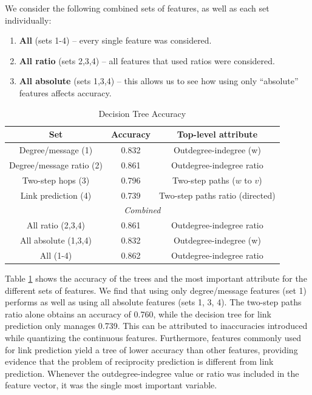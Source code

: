 \documentclass[conference]{IEEEtran}
\begin{document}
We consider the following combined sets of features, as well as each set individually:
\begin{enumerate}
	\item {\bf All} (sets 1-4) -- every single feature was considered.
	\item {\bf All ratio} (sets 2,3,4) -- all features that used ratios were considered.
	\item {\bf All absolute} (sets 1,3,4) -- this allows us to see how using only ``absolute'' features affects accuracy.
\end{enumerate}
\begin{table}[!t]
\renewcommand{\arraystretch}{1.3}
\caption{Decision Tree Accuracy}
\label{table_recresults_dtree}
\centering
\begin{tabular}{|c||c|c|}
\hline
\bf{Set} & Accuracy & Top-level attribute \\
\hline
Degree/message (1) & 0.832 & Outdegree-indegree (w) \\
Degree/message ratio (2) & 0.861 & Outdegree-indegree ratio \\
Two-step hops (3) & 0.796 & Two-step paths ($w$ to $v$) \\
Link prediction (4) & 0.739 & Two-step paths ratio (directed) \\
\hline
\multicolumn{3}{|c|}{\emph{Combined}} \\
\hline
All ratio (2,3,4) & 0.861 & Outdegree-indegree ratio \\
All absolute (1,3,4) & 0.832 & Outdegree-indegree (w) \\
All (1-4) & 0.862 & Outdegree-indegree ratio \\
\hline
\end{tabular}
\end{table}

Table \ref{table_recresults_dtree} shows the accuracy of the trees and
the most important attribute for the different sets of features. We
find that using only degree/message features (set 1)
performs as well as using all absolute features (sets 1, 3, 4). 
The two-step paths ratio alone obtains an accuracy
of 0.760, while the decision tree for link prediction only
manages 0.739. This can be attributed to inaccuracies introduced
while quantizing the continuous features.
Furthermore, features commonly used for
link prediction yield a tree of lower accuracy than other features, providing evidence that  
the problem of reciprocity prediction is different
from link prediction.
Whenever the outdegree-indegree value or ratio was included in the feature vector, it was the single most important variable.
\end{document}
